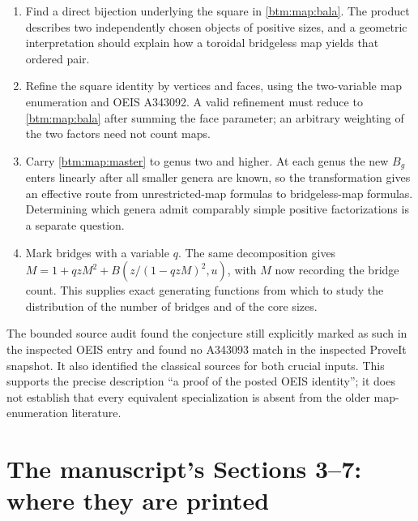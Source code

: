 \documentclass[11pt,letterpaper]{article}
\numberwithin{equation}{section}
\theoremstyle{definition}
\theoremstyle{remark}
\begin{document}
\begin{enumerate}
 \item Find a direct bijection underlying the square in
 \eqref{btm:map:bala}.  The product describes two independently chosen
 objects of positive sizes, and a geometric interpretation should explain
 how a toroidal bridgeless map yields that ordered pair.
 \item Refine the square identity by vertices and faces, using the
 two-variable map enumeration and OEIS A343092.  A valid refinement must
 reduce to \eqref{btm:map:bala} after summing the face parameter; an arbitrary
 weighting of the two factors need not count maps.
 \item Carry \eqref{btm:map:master} to genus two and higher.  At each genus
 the new $B_g$ enters linearly after all smaller genera are known, so the
 transformation gives an effective route from unrestricted-map formulas
 to bridgeless-map formulas.  Determining which genera admit comparably
 simple positive factorizations is a separate question.
 \item Mark bridges with a variable $q$.  The same decomposition gives
 $M=1+qzM^2+B(z/(1-qzM)^2,u)$, with $M$ now recording the bridge count.
 This supplies exact generating functions from which to study the
 distribution of the number of bridges and of the core sizes.
\end{enumerate}

The bounded source audit found the conjecture still explicitly marked
as such in the inspected OEIS entry and found no A343093 match in the
inspected ProveIt snapshot.  It also identified the classical sources
for both crucial inputs.  This supports the precise description
``a proof of the posted OEIS identity''; it does not establish that every
equivalent specialization is absent from the older map-enumeration
literature.


\clearpage
\section{The manuscript's Sections 3--7: where they are printed}
\label{btm:sec:elsewhere}
\end{document}
